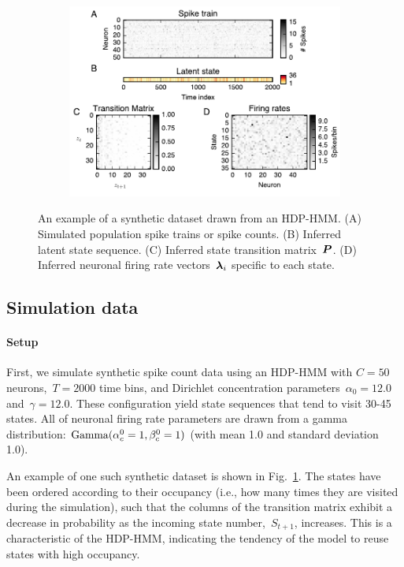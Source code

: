 \begin{figure}
  \centering
  \begin{subfigure}[t]{5.in}
    \includegraphics[width=\textwidth]{figures/ch5/Fig1}
  \end{subfigure}
  \vspace{-.2in}
  \caption[A synthetic dataset drawn from an HDP-HMM]{ An example of a
    synthetic dataset drawn from an HDP-HMM.  (A) Simulated population
    spike trains or spike counts. (B) Inferred latent state
    sequence. (C) Inferred state transition matrix~$\boldsymbol{P}$. (D) Inferred
    neuronal firing rate vectors~$\boldsymbol{\lambda}_i$ specific to each state.}
\label{fig1}
\end{figure}

 \subsection{Simulation data}

\paragraph{Setup} 
 First, we simulate synthetic spike count data using an HDP-HMM with
 ${C=50}$ neurons,~${T=2000}$ time bins, and Dirichlet concentration
 parameters~$\alpha_0=12.0$ and~$\gamma=12.0$. These configuration
 yield state sequences that tend to visit 30-45 states. All of
 neuronal firing rate parameters are drawn from a gamma distribution:
 $\mathrm{Gamma}(\alpha_c^0=1, \beta_c^0=1)$ (with mean 1.0 and standard
 deviation 1.0).
 
 An example of one such synthetic dataset is shown in
 Fig.~\ref{fig1}. The states have been ordered according to their
 occupancy (i.e., how many times they are visited during the
 simulation), such that the columns of the transition matrix exhibit a
 decrease in probability as the incoming state number,~${S}_{t+1}$,
 increases. This is a characteristic of the HDP-HMM, indicating the
 tendency of the model to reuse states with high occupancy.

